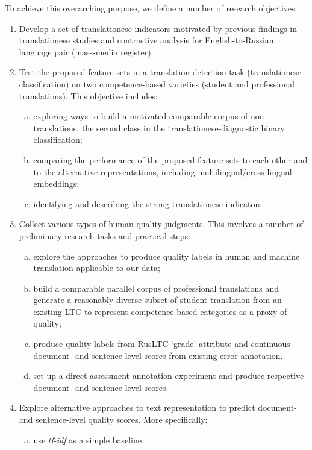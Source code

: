 To achieve this overarching purpose, we define a number of research objectives:
\begin{enumerate}\compresslist{}
	\item Develop a set of translationese indicators motivated by previous findings in translationese studies and contrastive analysis for English-to-Russian language pair (mass-media register).
	\item Test the proposed feature sets in a translation detection task (translationese classification) on two competence-based varieties (student and professional translations). This objective includes:
	\begin{enumerate}[(a)]\compresslist{}
		\item exploring ways to build a motivated comparable corpus of non-translations, the second class in the translationese-diagnostic binary classification; 
		\item comparing the performance of the proposed feature sets to each other and to the alternative representations, including multilingual/cross-lingual embeddings;
		\item identifying and describing the strong translationese indicators.
	\end{enumerate}
	\item Collect various types of human quality judgments. This involves a number of preliminary research tasks and practical steps:
	\begin{enumerate}[(a)]
		\item explore the approaches to produce quality labels in human and machine translation applicable to our data;
		\item build a comparable parallel corpus of professional translations and generate a reasonably diverse subset of student translation from an existing \gls{LTC} to represent competence-based categories as a proxy of quality;
		\item produce quality labels from \gls{RusLTC} `grade' attribute and continuous document- and sentence-level scores from existing error annotation.
		\item set up a direct assessment annotation experiment and produce respective document- and sentence-level scores.
	\end{enumerate} 
	\item Explore alternative approaches to text representation to predict document- and sentence-level quality scores. More specifically:
	\begin{enumerate}[(a)]
		\item use \textit{tf-idf} as a simple baseline,

\end{enumerate}
\end{enumerate}

